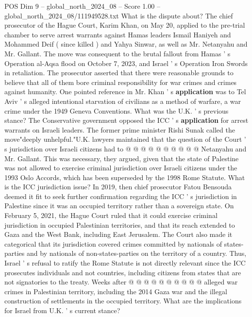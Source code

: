 \begin{textsample}{POS Dim 9 – global\_north\_2024\_08 – Score 1.00 – global\_north\_2024\_08/111949528.txt}  \label{ex:f9_pos_361}
What is the dispute about?
The chief prosecutor of the Hague Court, Karim Khan, on May 20, applied to the pre-trial chamber to serve arrest warrants against Hamas leaders Ismail Haniyeh and Mohammed Deif ( since killed ) and Yahya Sinwar, as well as Mr.
Netanyahu and Mr.
Gallant.
The move was consequent to the brutal fallout from Hamas ' s Operation al-Aqsa flood on October 7, 2023, and Israel ' s Operation Iron Swords in retaliation.
The prosecutor asserted that there were reasonable grounds to believe that all of them bore criminal responsibility for war crimes and crimes against humanity.
One pointed reference in Mr.
Khan ' s \textbf{application} was to Tel Aviv ' s alleged intentional starvation of civilians as a method of warfare, a war crime under the 1949 Geneva Conventions.
What was the U.K. ' s previous stance?
The Conservative government opposed the ICC ' s \textbf{application} for arrest warrants on Israeli leaders.
The former prime minister Rishi Sunak called the move"deeply unhelpful."U.K. lawyers maintained that the question of the Court ' s jurisdiction over Israeli citizens had to @ @ @ @ @ @ @ @ @ @ Netanyahu and Mr.
Gallant.
This was necessary, they argued, given that the state of Palestine was not allowed to exercise criminal jurisdiction over Israeli citizens under the 1993 Oslo Accords, which has been superseded by the 1998 Rome Statute.
What is the ICC jurisdiction issue?
In 2019, then chief prosecutor Fatou Bensouda deemed it fit to seek further confirmation regarding the ICC ' s jurisdiction in Palestine since it was an occupied territory rather than a sovereign state.
On February 5, 2021, the Hague Court ruled that it could exercise criminal jurisdiction in occupied Palestinian territories, and that its reach extended to Gaza and the West Bank, including East Jerusalem.
The Court also made it categorical that its jurisdiction covered crimes committed by nationals of states-parties and by nationals of non-states-parties on the territory of a country.
Thus, Israel ' s refusal to ratify the Rome Statute is not directly relevant since the ICC prosecutes individuals and not countries, including citizens from states that are not signatories to the treaty.
Weeks after @ @ @ @ @ @ @ @ @ @ alleged war crimes in Palestinian territory, including the 2014 Gaza war and the illegal construction of settlements in the occupied territory.
What are the implications for Israel from U.K. ' s current stance?

\end{textsample}
